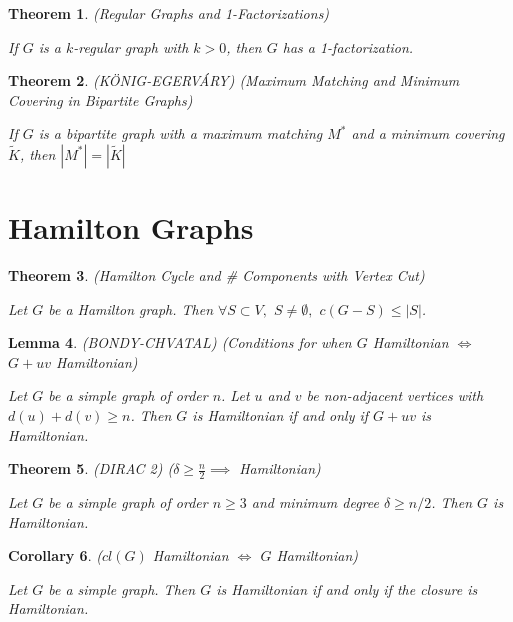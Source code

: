\documentclass[12pt]{amsart}
\newtheorem{thm}{Theorem}
\newtheorem{lem}[thm]{Lemma}
\newtheorem{cor}[thm]{Corollary}
\theoremstyle{definition}
\begin{document}
\begin{thm} (Regular Graphs and 1-Factorizations)

If $G$ is a $k$-regular graph with $k > 0$, then $G$ has a 1-factorization.
\end{thm}


\begin{thm} (K\"{O}NIG-EGERV\'{A}RY) (Maximum Matching and Minimum Covering in Bipartite Graphs)

If $G$ is a bipartite graph with a maximum matching $M^*$ and a minimum covering $\widetilde{K}$, then $|M^*|=|\widetilde{K}|$
\end{thm}


\section{Hamilton Graphs}


\begin{thm} (Hamilton Cycle and \# Components with Vertex Cut)

Let $G$ be a Hamilton graph. Then $\forall S\subset V,$ $S\neq \emptyset,$ $c(G-S)\leq |S|$.
\end{thm}

\begin{lem} (BONDY-CHVATAL) (Conditions for when $G$ Hamiltonian $\Longleftrightarrow$ $G+uv$ Hamiltonian)

Let $G$ be a simple graph of order $n$. Let $u$ and $v$ be non-adjacent vertices with $d(u) + d(v) \geq n$. Then $G$ is Hamiltonian if and only if $G+uv$ is Hamiltonian.
\end{lem}


\begin{thm} (DIRAC 2) ($\delta\geq \frac{n}{2}\implies$ Hamiltonian)

Let $G$ be a simple graph of order $n \geq 3$ and minimum degree $\delta \geq n/2$. Then $G$ is Hamiltonian.
\end{thm}

\begin{cor} ($cl(G)$ Hamiltonian $\Longleftrightarrow$ $G$ Hamiltonian)

Let $G$ be a simple graph. Then $G$ is Hamiltonian if and only if the closure is Hamiltonian.
\end{cor}
\end{document}

